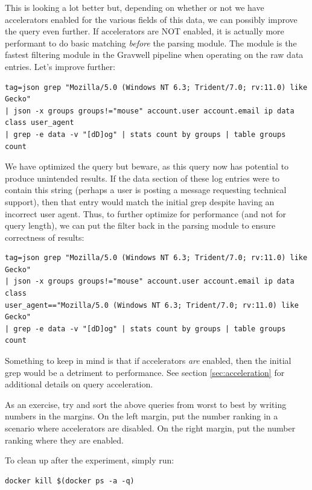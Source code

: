 This is looking a lot better but, depending on whether or not we have
accelerators enabled for the various fields of this data, we can
possibly improve the query even further. If accelerators are NOT
enabled, it is actually more performant to do basic matching \emph{before} the
parsing module. The  module is the fastest filtering module in the
Gravwell pipeline when operating on the raw data entries. Let's improve
further:

\begin{Verbatim}[breaklines=true]
tag=json grep "Mozilla/5.0 (Windows NT 6.3; Trident/7.0; rv:11.0) like Gecko" 
| json -x groups groups!="mouse" account.user account.email ip data class user_agent
| grep -e data -v "[dD]og" | stats count by groups | table groups count
\end{Verbatim}

We have optimized the query but beware, as this query now has
potential to produce unintended results. If the data section of these
log entries were to contain this  string (perhaps a user is
posting a message requesting technical support), then that entry would
match the initial grep despite having an incorrect user agent. Thus, to
further optimize for performance (and not for query length), we can put
the filter back in the parsing module to ensure correctness of results:

\begin{Verbatim}[breaklines=true]
tag=json grep "Mozilla/5.0 (Windows NT 6.3; Trident/7.0; rv:11.0) like Gecko" 
| json -x groups groups!="mouse" account.user account.email ip data class 
user_agent=="Mozilla/5.0 (Windows NT 6.3; Trident/7.0; rv:11.0) like Gecko"
| grep -e data -v "[dD]og" | stats count by groups | table groups count
\end{Verbatim}

Something to keep in mind is that if accelerators \emph{are} enabled, then the
initial grep would be a detriment to performance. See section \ref{sec:acceleration} for additional
details on query acceleration.

As an exercise, try and sort the above queries from worst to best by
writing numbers in the margins. On the left margin, put the number
ranking in a scenario where accelerators are disabled. On the right
margin, put the number ranking where they are enabled.

To clean up after the experiment, simply run:

\begin{Verbatim}[breaklines=true]
docker kill $(docker ps -a -q)
\end{Verbatim}





